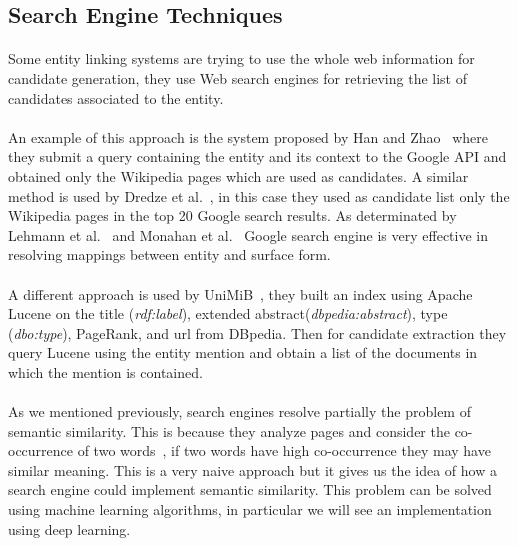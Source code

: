 \subsection{Search Engine Techniques}
\paragraph{}
Some entity linking systems are trying to use the whole web information for candidate generation, they use Web search engines for retrieving the list of candidates associated to the entity.

\paragraph{}
An example of this approach is the system proposed by Han and Zhao~\cite{han2009nlpr_kbp} where they submit a query containing the entity and its context to the Google API and obtained only the Wikipedia pages which are used as candidates. A similar method is used by Dredze et al.~\cite{dredze2010entity}, in this case they used as candidate list only the Wikipedia pages in the top 20 Google search results. As determinated by Lehmann et al.~\cite{lehmann2010lcc} and Monahan et al.~\cite{monahan2011cross} Google search engine is very effective in resolving mappings between entity and surface form.

\paragraph{}
A different approach is used by UniMiB~\cite{caliano2016unimib}, they built an index using Apache Lucene on the title (\textit{rdf:label}), extended abstract(\textit{dbpedia:abstract}), type (\textit{dbo:type}), PageRank, and url from DBpedia. Then for candidate extraction they query Lucene using the entity mention and obtain a list of the documents in which the mention is contained.

\paragraph{}
As we mentioned previously, search engines resolve partially the problem of semantic similarity. This is because they analyze pages and consider the co-occurrence of two words~\cite{bollegala2007measuring}, if two words have high co-occurrence they may have similar meaning. This is a very naive approach but it gives us the idea of how a search engine could implement semantic similarity. This problem can be solved using machine learning algorithms, in particular we will see an implementation using deep learning.

